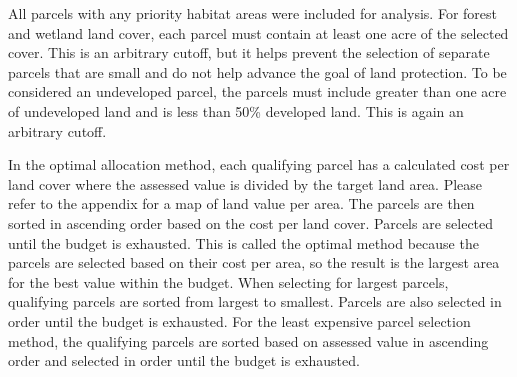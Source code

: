 \documentclass[12pt, stu, floatsintext,table]{apa7}
\begin{document}
All parcels with any priority habitat areas were included for analysis. For forest and wetland land cover, each parcel must contain at least one acre of the selected cover. This is an arbitrary cutoff, but it helps prevent the selection of separate parcels that are small and do not help advance the goal of land protection. To be considered an undeveloped parcel, the parcels must include greater than one acre of undeveloped land and is less than 50\% developed land. This is again an arbitrary cutoff. 

In the optimal allocation method, each qualifying parcel has a calculated cost per land cover where the assessed value is divided by the target land area. Please refer to the appendix for a map of land value per area. The parcels are then sorted in ascending order based on the cost per land cover. Parcels are selected until the budget is exhausted. This is called the optimal method because the parcels are selected based on their cost per area, so the result is the largest area for the best value within the budget. When selecting for largest parcels, qualifying parcels are sorted from largest to smallest. Parcels are also selected in order until the budget is exhausted. For the least expensive parcel selection method, the qualifying parcels are sorted based on assessed value in ascending order and selected in order until the budget is exhausted. 
\end{document}
